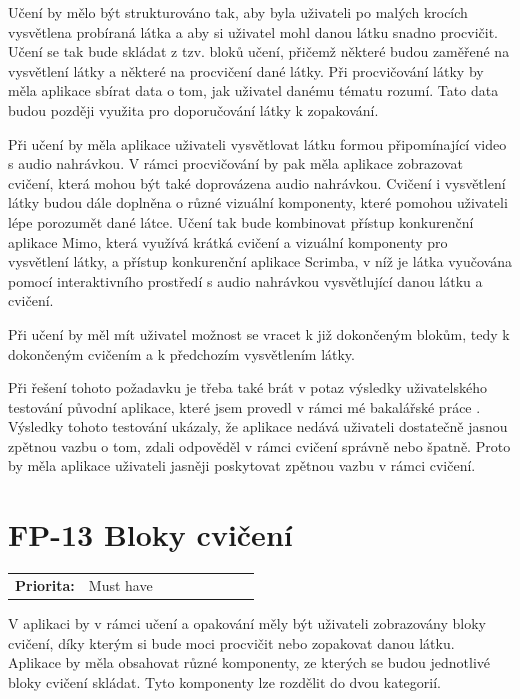 Učení by mělo být strukturováno tak, aby byla uživateli po malých krocích vysvětlena probíraná látka a aby si uživatel mohl danou látku snadno procvičit. Učení se tak bude skládat z tzv. bloků učení, přičemž některé budou zaměřené na vysvětlení látky a některé na procvičení dané látky. Při procvičování látky by měla aplikace sbírat data o tom, jak uživatel danému tématu rozumí. Tato data budou později využita pro doporučování látky k zopakování.

Při učení by měla aplikace uživateli vysvětlovat látku formou připomínající video s audio nahrávkou. V rámci procvičování by pak měla aplikace zobrazovat cvičení, která mohou být také doprovázena audio nahrávkou. Cvičení i vysvětlení látky budou dále doplněna o různé vizuální komponenty, které pomohou uživateli lépe porozumět dané látce. Učení tak bude kombinovat přístup konkurenční aplikace Mimo, která využívá krátká cvičení a vizuální komponenty pro vysvětlení látky, a přístup konkurenční aplikace Scrimba, v níž je látka vyučována pomocí interaktivního prostředí s audio nahrávkou vysvětlující danou látku a cvičení.

Při učení by měl mít uživatel možnost se vracet k již dokončeným blokům, tedy k dokončeným cvičením a k předchozím vysvětlením látky.

Při řešení tohoto požadavku je třeba také brát v potaz výsledky uživatelského testování původní aplikace, které jsem provedl v rámci mé bakalářské práce \cite{Jenicek2024BachelorThesis}. Výsledky tohoto testování ukázaly, že aplikace nedává uživateli dostatečně jasnou zpětnou vazbu o tom, zdali odpověděl v rámci cvičení správně nebo špatně. Proto by měla aplikace uživateli jasněji poskytovat zpětnou vazbu v rámci cvičení.

\section{FP-13 Bloky cvičení}\label{sec:fp-exercise-blocks}

\begin{tabular}{lp{0.7\linewidth}}
    \textbf{Priorita:} & Must have \\
\end{tabular}

V aplikaci by v rámci učení a opakování měly být uživateli zobrazovány bloky cvičení, díky kterým si bude moci procvičit nebo zopakovat danou látku. Aplikace by měla obsahovat různé komponenty, ze kterých se budou jednotlivé bloky cvičení skládat. Tyto komponenty lze rozdělit do dvou kategorií.


